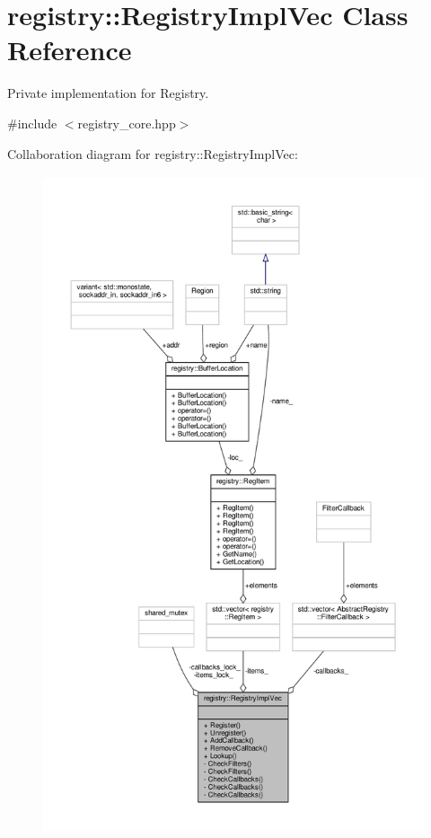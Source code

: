 \hypertarget{classregistry_1_1RegistryImplVec}{}\section{registry\+:\+:Registry\+Impl\+Vec Class Reference}
\label{classregistry_1_1RegistryImplVec}


Private implementation for Registry.  




{\ttfamily \#include $<$registry\+\_\+core.\+hpp$>$}



Collaboration diagram for registry\+:\+:Registry\+Impl\+Vec\+:
\nopagebreak
\begin{figure}[H]
\begin{center}
\leavevmode
\includegraphics[height=550pt]{classregistry_1_1RegistryImplVec__coll__graph}
\end{center}
\end{figure}
